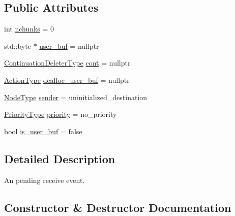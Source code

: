 \subsection*{Public Attributes}
\begin{DoxyCompactItemize}
\item 
int \hyperlink{structvt_1_1messaging_1_1_pending_recv_a81f94488ff0b51d17d09fad4db88ea37}{nchunks} = 0
\item 
std\+::byte $\ast$ \hyperlink{structvt_1_1messaging_1_1_pending_recv_acd0f33d9bdfaf6ba3d283d8e289eee86}{user\+\_\+buf} = nullptr
\item 
\hyperlink{namespacevt_a6de3bd201e2a040be9362d9d24d1e446}{Continuation\+Deleter\+Type} \hyperlink{structvt_1_1messaging_1_1_pending_recv_a38dbaba9db9f4fd8d3e72553f030a21d}{cont} = nullptr
\item 
\hyperlink{namespacevt_ae0a5a7b18cc99d7b732cb4d44f46b0f3}{Action\+Type} \hyperlink{structvt_1_1messaging_1_1_pending_recv_a1d0de0586d485b2b6af7daacafa7ea0d}{dealloc\+\_\+user\+\_\+buf} = nullptr
\item 
\hyperlink{namespacevt_a866da9d0efc19c0a1ce79e9e492f47e2}{Node\+Type} \hyperlink{structvt_1_1messaging_1_1_pending_recv_a7bf339cd65c0b4caad259825eb7861d5}{sender} = uninitialized\+\_\+destination
\item 
\hyperlink{namespacevt_a86bff9f556eb761b27fc8600d006ac04}{Priority\+Type} \hyperlink{structvt_1_1messaging_1_1_pending_recv_ac532592ff86b902de3c38c971db6290e}{priority} = no\+\_\+priority
\item 
bool \hyperlink{structvt_1_1messaging_1_1_pending_recv_a232d976ea4bb28426530e8c431c52f95}{is\+\_\+user\+\_\+buf} = false
\end{DoxyCompactItemize}


\subsection{Detailed Description}
An pending receive event. 

\subsection{Constructor \& Destructor Documentation}
\mbox{\label{structvt_1_1messaging_1_1_pending_recv_ada81b3367eca241184cfcf7e77aacacb}} 
